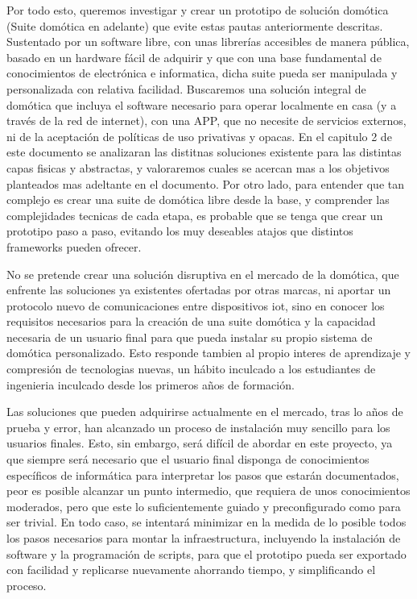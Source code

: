 Por todo esto, queremos investigar y crear un prototipo de solución domótica (Suite domótica en adelante) que evite estas pautas anteriormente descritas. Sustentado por un software libre, con unas librerías accesibles de manera pública, basado en un hardware fácil de adquirir y que con una base fundamental de conocimientos de electrónica e informatica, dicha suite pueda ser manipulada y personalizada con relativa facilidad. Buscaremos una solución integral de domótica que incluya el software necesario para operar localmente en casa (y a través de la red de internet), con una APP, que no necesite de servicios externos, ni de la aceptación de políticas de uso privativas y opacas. En el capitulo 2 de este documento se analizaran las distitnas soluciones existente para las distintas capas fisicas y abstractas, y valoraremos cuales se acercan mas a los objetivos planteados mas adeltante en el documento. Por otro lado, para entender que tan complejo es crear una suite de domótica libre desde la base, y comprender las complejidades tecnicas de cada etapa, es probable que se tenga que crear un prototipo paso a paso, evitando los muy deseables atajos que distintos frameworks pueden ofrecer.

\vspace{1cm}

No se pretende crear una solución disruptiva en el mercado de la domótica, que enfrente las soluciones ya existentes ofertadas por otras marcas, ni aportar un protocolo nuevo de comunicaciones entre dispositivos \gls{iot}, sino en conocer los requisitos necesarios para la creación de una suite domótica y la capacidad necesaria de un usuario final para que pueda instalar su propio sistema de domótica personalizado. Esto responde tambien al propio interes de aprendizaje y compresión de tecnologias nuevas, un hábito inculcado a los estudiantes de ingenieria inculcado desde los primeros años de formación.

\vspace{1cm}

Las soluciones que pueden adquirirse actualmente en el mercado, tras lo años de prueba y error, han alcanzado un proceso de instalación muy sencillo para los usuarios finales. Esto, sin embargo, será difícil de abordar en este proyecto, ya que siempre será necesario que el usuario final disponga de conocimientos específicos de informática para interpretar los pasos que estarán documentados, peor es posible alcanzar un punto intermedio, que requiera de unos conocimientos moderados, pero que este lo suficientemente guiado y preconfigurado como para ser trivial. En todo caso, se intentará minimizar en la medida de lo posible todos los pasos necesarios para montar la infraestructura, incluyendo la instalación de software y la programación de scripts, para que el prototipo pueda ser exportado con facilidad y replicarse nuevamente ahorrando tiempo, y simplificando el proceso.


